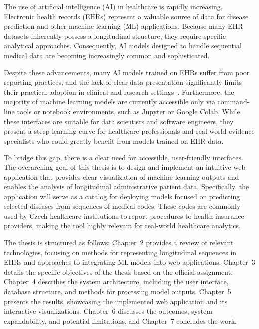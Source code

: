 The use of artificial intelligence (AI) in healthcare is rapidly increasing. Electronic health records (EHRs) represent a valuable source of data for disease prediction and other machine learning (ML) applications. Because many EHR datasets inherently possess a longitudinal structure, they require specific analytical approaches. Consequently, AI models designed to handle sequential medical data are becoming increasingly common and sophisticated.

Despite these advancements, many AI models trained on EHRs suffer from poor reporting practices, and the lack of clear data presentation significantly limits their practical adoption in clinical and research settings~\cite{placeholder_source}. Furthermore, the majority of machine learning models are currently accessible only via command-line tools or notebook environments, such as Jupyter or Google Colab. While these interfaces are suitable for data scientists and software engineers, they present a steep learning curve for healthcare professionals and real-world evidence specialists who could greatly benefit from models trained on EHR data. 

To bridge this gap, there is a clear need for accessible, user-friendly interfaces. The overarching goal of this thesis is to design and implement an intuitive web application that provides clear visualization of machine learning outputs and enables the analysis of longitudinal administrative patient data. Specifically, the application will serve as a catalog for deploying models focused on predicting selected diseases from sequences of medical codes. These codes are commonly used by Czech healthcare institutions to report procedures to health insurance providers, making the tool highly relevant for real-world healthcare analytics.

The thesis is structured as follows: Chapter~2 provides a review of relevant technologies, focusing on methods for representing longitudinal sequences in EHRs and approaches to integrating ML models into web applications. Chapter~3 details the specific objectives of the thesis based on the official assignment. Chapter~4 describes the system architecture, including the user interface, database structure, and methods for processing model outputs. Chapter~5 presents the results, showcasing the implemented web application and its interactive visualizations. Chapter~6 discusses the outcomes, system expandability, and potential limitations, and Chapter~7 concludes the work.
